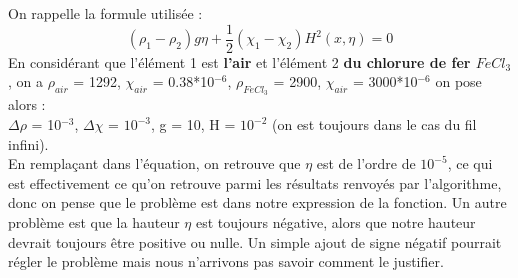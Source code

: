 \documentclass{article}
\begin{document}
\newline
On rappelle la formule utilisée : 
\begin{equation}
(\rho_{1} - \rho_{2})g\eta + \frac{1}{2}(\chi_{1} - \chi_{2})H^{2}(x,\eta)=0
\label{eq07}
\end{equation}
En considérant que l'élément 1 est \textbf{l'air} et l'élément 2 \textbf{du chlorure de fer $FeCl_{3}$}, on a $\rho_{air}$ = 1292, $\chi_{air}$ = 0.38*10$^{-6}$, $\rho_{FeCl_{3}}$ = 2900, $\chi_{air}$ = 3000*10$^{-6}$ on pose alors : \\
$\Delta\rho$ = 10$^{-3}$, $\Delta\chi$ = $10^{-3}$, g = 10, H = $10^{-2}$ (on est toujours dans le cas du fil infini). \\
En remplaçant dans l'équation, on retrouve que $\eta$ est de l'ordre de $10^{-5}$, ce qui est effectivement ce qu'on retrouve parmi les résultats renvoyés par l'algorithme, donc on pense que le problème est dans notre expression de la fonction.
\newline\newline
Un autre problème est que la hauteur $\eta$ est toujours négative, alors que notre hauteur devrait toujours être positive ou nulle. Un simple ajout de signe négatif pourrait régler le problème mais nous n'arrivons pas savoir comment le justifier. 
\end{document}
